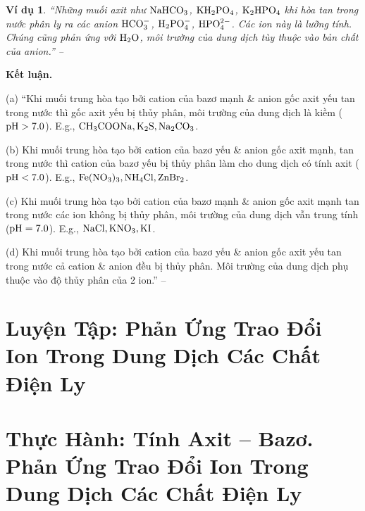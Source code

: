 \documentclass[oneside]{book}
\numberwithin{equation}{section}
\newtheorem{vidu}{Ví dụ}[section]
\begin{document}
\begin{vidu}
	``Những muối axit như $\rm NaHCO_3$, $\rm KH_2PO_4$, $\rm K_2HPO_4$ khi hòa tan trong nước phân ly ra các anion $\rm HCO_3^-$, $\rm H_2PO_4^-$, $\rm HPO_4^{2-}$. Các ion này là lưỡng tính. Chúng cũng phản ứng với $\rm H_2O$, môi trường của dung dịch tùy thuộc vào bản chất của anion.'' -- \cite[p. 28]{SGK_Hoa_Hoc_11_nang_cao}
\end{vidu}
\noindent\textbf{Kết luận.}
\begin{enumerate*}
	\item[(a)] ``Khi muối trung hòa tạo bởi cation của bazơ mạnh \& anion gốc axit yếu tan trong nước thì gốc axit yếu bị thủy phân, môi trường của dung dịch là kiềm ($\rm pH > 7.0$). E.g., $\rm CH_3COONa,K_2S,Na_2CO_3$.
	\item[(b)] Khi muối trung hòa tạo bởi cation của bazơ yếu \& anion gốc axit mạnh, tan trong nước thì cation của bazơ yếu bị thủy phân làm cho dung dịch có tính axit ($\rm pH < 7.0$). E.g., $\rm Fe(NO_3)_3,NH_4Cl,ZnBr_2$.
	\item[(c)] Khi muối trung hòa tạo bởi cation của bazơ mạnh \& anion gốc axit mạnh tan trong nước các ion không bị thủy phân, môi trường của dung dịch vẫn trung tính ($\rm pH = 7.0$). E.g., $\rm NaCl,KNO_3,KI$.
	\item[(d)] Khi muối trung hòa tạo bởi cation của bazơ yếu \& anion gốc axit yếu tan trong nước cả cation \& anion đều bị thủy phân. Môi trường của dung dịch phụ thuộc vào độ thủy phân của 2 ion.'' -- \cite[p. 28]{SGK_Hoa_Hoc_11_nang_cao}
\end{enumerate*}


\section{Luyện Tập: Phản Ứng Trao Đổi Ion Trong Dung Dịch Các Chất Điện Ly}


\section{Thực Hành: Tính Axit -- Bazơ. Phản Ứng Trao Đổi Ion Trong Dung Dịch Các Chất Điện Ly}

\end{document}
